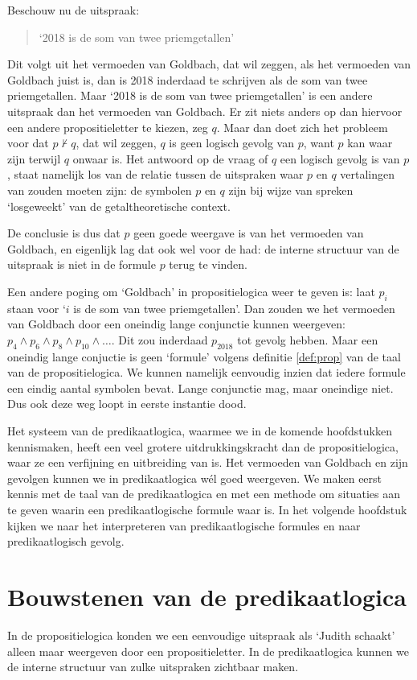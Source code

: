 Beschouw nu de uitspraak:
\begin{quote}
    `2018 is de som van twee priemgetallen'
\end{quote}
Dit volgt uit het vermoeden van Goldbach, dat wil zeggen, als het vermoeden van Goldbach juist is, dan is 2018 inderdaad te schrijven als de som van twee priemgetallen. Maar `2018 is de som van twee priemgetallen' is een andere uitspraak dan het vermoeden van Goldbach. Er zit niets anders op dan hiervoor een andere propositieletter te kiezen, zeg $q$. Maar dan doet zich het probleem voor dat $p\not\vdash q$, dat wil zeggen, $q$ is geen logisch gevolg van $p$, want $p$ kan waar zijn terwijl $q$ onwaar is. Het antwoord op de vraag of $q$ een logisch gevolg is van $p$, staat namelijk los van de relatie tussen de uitspraken waar $p$ en $q$ vertalingen van zouden moeten zijn: de symbolen $p$ en $q$ zijn bij wijze van spreken `losgeweekt' van de getaltheoretische context.

De conclusie is dus dat $p$ geen goede weergave is van het vermoeden van Goldbach, en eigenlijk lag dat ook wel voor de had: de interne structuur van de uitspraak is niet in de formule $p$ terug te vinden.

Een andere poging om `Goldbach' in propositielogica weer te geven is: laat $p_i$ staan voor `$i$ is de som van twee priemgetallen'. Dan zouden we het vermoeden van Goldbach door een oneindig lange conjunctie kunnen weergeven: $p_4\wedge p_6\wedge p_8\wedge p_{10}\wedge\ldots$. Dit zou inderdaad $p_{2018}$ tot gevolg hebben. Maar een oneindig lange conjuctie is geen `formule' volgens definitie \ref{def:prop} van de taal van de propositielogica. We kunnen namelijk eenvoudig inzien dat iedere formule een eindig aantal symbolen bevat. Lange conjunctie mag, maar oneindige niet. Dus ook deze weg loopt in eerste instantie dood.

Het systeem van de predikaatlogica, waarmee we in de komende hoofdstukken kennismaken, heeft een veel grotere uitdrukkingskracht dan de propositielogica, waar ze een verfijning en uitbreiding van is. Het vermoeden van Goldbach en zijn gevolgen kunnen we in predikaatlogica w\'el goed weergeven. We maken eerst kennis met de taal van de predikaatlogica en met een methode om situaties aan te geven waarin een predikaatlogische formule waar is. In het volgende hoofdstuk kijken we naar het interpreteren van predikaatlogische formules en naar predikaatlogisch gevolg.

\section{Bouwstenen van de predikaatlogica}
In de propositielogica konden we een eenvoudige uitspraak als `Judith schaakt' alleen maar weergeven door een propositieletter. In de predikaatlogica kunnen we de interne structuur van zulke uitspraken zichtbaar maken.

